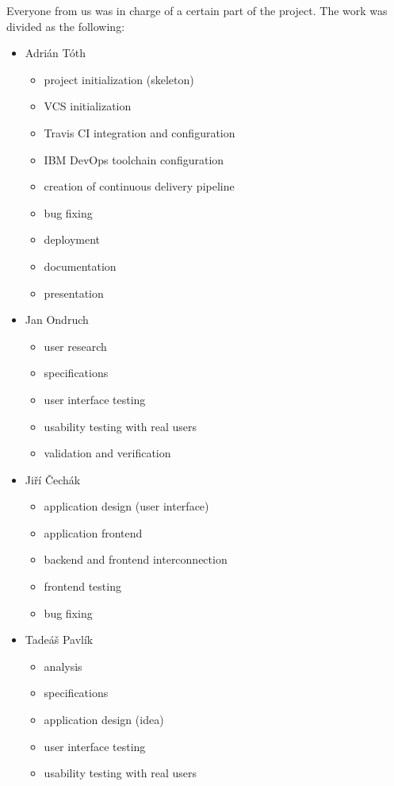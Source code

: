 \documentclass[11pt,a4paper]{article}
\begin{document}
Everyone from us was in charge of a certain part of the project. The work was divided as the following:
\begin{itemize}
    \item Adrián Tóth
    \begin{itemize}
        \item project initialization (skeleton)
        \item VCS initialization
        \item Travis CI integration and configuration
        \item IBM DevOps toolchain configuration
        \item creation of continuous delivery pipeline
        \item bug fixing
        \item deployment
        \item documentation
        \item presentation
    \end{itemize}

    \item Jan Ondruch
    \begin{itemize}
        \item user research
        \item specifications
        \item user interface testing
        \item usability testing with real users
        \item validation and verification
    \end{itemize}

    \item Jiří Čechák
    \begin{itemize}
        \item application design (user interface)
        \item application frontend
        \item backend and frontend interconnection
        \item frontend testing
        \item bug fixing
    \end{itemize}

    \item Tadeáš Pavlík
    \begin{itemize}
        \item analysis
        \item specifications
        \item application design (idea)
        \item user interface testing
        \item usability testing with real users
    \end{itemize}


\end{itemize}
\end{document}
